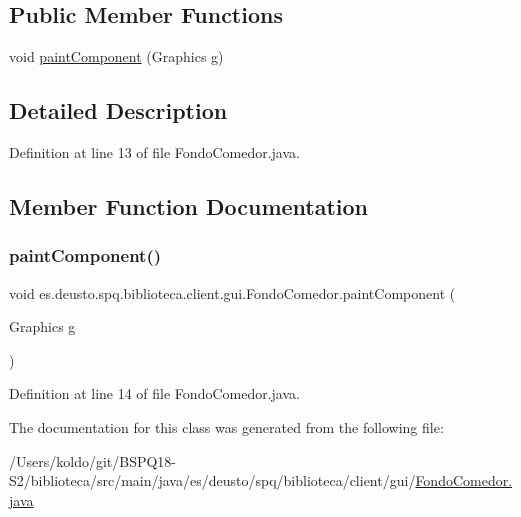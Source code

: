 \subsection*{Public Member Functions}
\begin{DoxyCompactItemize}
\item 
void \mbox{\hyperlink{classes_1_1deusto_1_1spq_1_1biblioteca_1_1client_1_1gui_1_1_fondo_comedor_aeb5871f500a09b68f3a55a1be4476ead}{paint\+Component}} (Graphics g)
\end{DoxyCompactItemize}


\subsection{Detailed Description}


Definition at line 13 of file Fondo\+Comedor.\+java.



\subsection{Member Function Documentation}
\mbox{\label{classes_1_1deusto_1_1spq_1_1biblioteca_1_1client_1_1gui_1_1_fondo_comedor_aeb5871f500a09b68f3a55a1be4476ead}} 
\subsubsection{\texorpdfstring{paint\+Component()}{paintComponent()}}
{\footnotesize\ttfamily void es.\+deusto.\+spq.\+biblioteca.\+client.\+gui.\+Fondo\+Comedor.\+paint\+Component (\begin{DoxyParamCaption}\item[{Graphics}]{g }\end{DoxyParamCaption})}



Definition at line 14 of file Fondo\+Comedor.\+java.



The documentation for this class was generated from the following file\+:\begin{DoxyCompactItemize}
\item 
/\+Users/koldo/git/\+B\+S\+P\+Q18-\/\+S2/biblioteca/src/main/java/es/deusto/spq/biblioteca/client/gui/\mbox{\hyperlink{_fondo_comedor_8java}{Fondo\+Comedor.\+java}}\end{DoxyCompactItemize}

